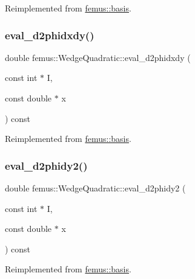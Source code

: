 Reimplemented from \mbox{\hyperlink{classfemus_1_1basis_a0a9839e75d1c9c8302486fc072eed028}{femus\+::basis}}.

\mbox{\label{classfemus_1_1_wedge_quadratic_a023bc861013903cfda90cd78069c3d3c}} 
\subsubsection{\texorpdfstring{eval\+\_\+d2phidxdy()}{eval\_d2phidxdy()}}
{\footnotesize\ttfamily double femus\+::\+Wedge\+Quadratic\+::eval\+\_\+d2phidxdy (\begin{DoxyParamCaption}\item[{const int $\ast$}]{I,  }\item[{const double $\ast$}]{x }\end{DoxyParamCaption}) const\hspace{0.3cm}{\ttfamily [virtual]}}



Reimplemented from \mbox{\hyperlink{classfemus_1_1basis_ac9feaf9e60421143db2a3708f3c7fa48}{femus\+::basis}}.

\mbox{\label{classfemus_1_1_wedge_quadratic_aeb0f88d015d9a6c4a44555d13eb4feff}} 
\subsubsection{\texorpdfstring{eval\+\_\+d2phidy2()}{eval\_d2phidy2()}}
{\footnotesize\ttfamily double femus\+::\+Wedge\+Quadratic\+::eval\+\_\+d2phidy2 (\begin{DoxyParamCaption}\item[{const int $\ast$}]{I,  }\item[{const double $\ast$}]{x }\end{DoxyParamCaption}) const\hspace{0.3cm}{\ttfamily [virtual]}}



Reimplemented from \mbox{\hyperlink{classfemus_1_1basis_a0febb29fe4b32213ff8d6d428f7241cd}{femus\+::basis}}.

